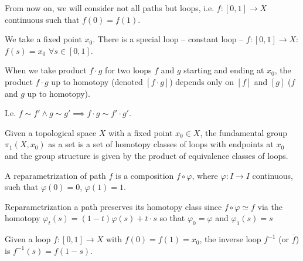 \documentclass[12pt]{article}					%
\begin{document}
\begin{poznamka}
	From now on, we will consider not all paths but loops, i.e. $f: [0, 1] \rightarrow X$ continuous such that $f(0) = f(1)$.

	We take a fixed point $x_0$. There is a special loop -- constant loop -- $f: [0, 1] \rightarrow X$: $f(s) = x_0$ $\forall s \in [0, 1]$.
\end{poznamka}

\begin{poznamka}
	When we take product $f·g$ for two loops $f$ and $g$ starting and ending at $x_0$, the product $f·g$ up to homotopy (denoted $[f·g]$) depends only on $[f]$ and $[g]$ ($f$ and $g$ up to homotopy).

	I.e. $f \sim f' \land g \sim g' \implies f·g \sim f'·g'$.
\end{poznamka}

\begin{definice}
	Given a topological space $X$ with a fixed point $x_0 \in X$, the fundamental group $π_1(X, x_0)$ as a set is a set of homotopy classes of loops with endpoints at $x_0$ and the group structure is given by the product of equivalence classes of loops.
\end{definice}

\begin{definice}
	A reparametrization of path $f$ is a composition $f ∘ φ$, where $φ: I \rightarrow I$ continuous, such that $φ(0) = 0$, $φ(1) = 1$.
\end{definice}

\begin{dusledek}
	Reparametrization a path preserves its homotopy class since $f ∘ φ \simeq f$ via the homotopy $φ_t(s) = (1 - t)φ(s) + t·s$ so that $φ_0 = φ$ and $φ_1(s) = s$
\end{dusledek}

\begin{definice}
	Given a loop $f: [0, 1] \rightarrow X$ with $f(0) = f(1) = x_0$, the inverse loop $f^{-1}$ (or $\overline{f}$) is $f^{-1}(s) = f(1 - s)$.
\end{definice}
\end{document}
